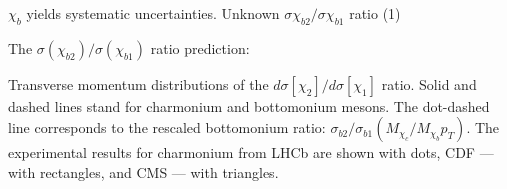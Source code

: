 \begin{frame}{$\chi_b$ yields systematic uncertainties. Unknown $\sigma{\chi_{b2}}/\sigma{\chi_{b1}}$ ratio (1)}

\centering

The $\sigma(\chi_{b2})/\sigma(\chi_{b1})$ ratio prediction:


\footnotesize
Transverse momentum distributions of the
$d\sigma\left[\chi_{2}\right]/d\sigma[\chi_{1}]$ ratio. Solid and dashed lines
stand for charmonium and bottomonium mesons. The dot-dashed line corresponds to
the rescaled bottomonium ratio:
$\sigma_{b2}/\sigma_{b1}(M_{\chi_c}/M_{\chi_b}p_T)$. The experimental results
for charmonium from LHCb are shown with dots, CDF --- with rectangles, and CMS
--- with triangles.
\end{frame}
